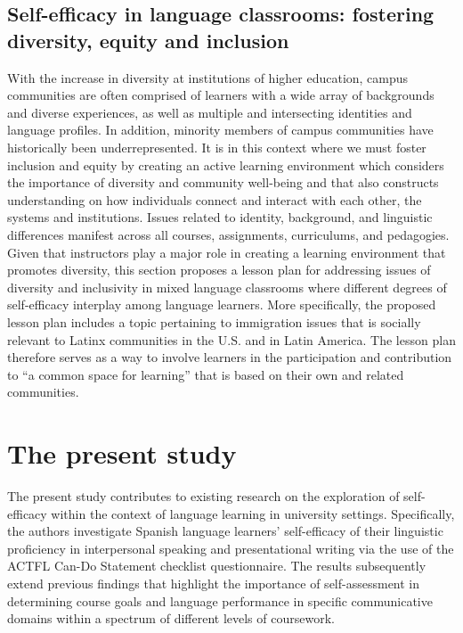\documentclass[output=paper]{langscibook}
\begin{document}
\subsection{{Self-efficacy in language classrooms: fostering diversity, equity and inclusion}}
With the increase in diversity at institutions of higher education, campus communities are often comprised of learners with a wide array of backgrounds and diverse experiences, as well as multiple and intersecting identities and language profiles. In addition, minority members of campus communities have historically been underrepresented. It is in this context where we must foster inclusion and equity by creating an active learning environment which considers the importance of diversity and community well-being and that also constructs understanding on how individuals connect and interact with each other, the systems and institutions. Issues related to identity, background, and linguistic differences manifest across all courses, assignments, curriculums, and pedagogies. Given that instructors play a major role in creating a learning environment that promotes diversity, this section proposes a lesson plan for addressing issues of diversity and inclusivity in mixed language classrooms where different degrees of self-efficacy interplay among language learners. More specifically, the proposed lesson plan includes a topic pertaining to immigration issues that is socially relevant to Latinx communities in the U.S. and in Latin America. The lesson plan therefore serves as a way to involve learners in the participation and contribution to “a common space for learning” that is based on their own and related communities.

\section{{The} {present} {study}}

The present study contributes to existing research on the exploration of self-efficacy within the context of language learning in university settings. Specifically, the authors investigate Spanish language learners’ self-efficacy of their linguistic proficiency in interpersonal speaking and presentational writing via the use of the ACTFL Can-Do Statement checklist questionnaire. The results subsequently extend previous findings that highlight the importance of self-as\-sess\-ment in determining course goals and language performance in specific communicative domains within a spectrum of different levels of coursework.
\end{document}
